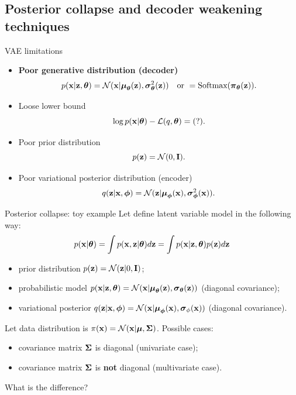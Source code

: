 \subsection{Posterior collapse and decoder weakening techniques}
\begin{frame}{VAE limitations}
	\begin{itemize}
		\item \textbf{Poor generative distribution (decoder)}
		\[
			p(\mathbf{x} | \mathbf{z}, \boldsymbol{\theta}) = \mathcal{N}(\mathbf{x}| \boldsymbol{\mu}_{\boldsymbol{\theta}}(\mathbf{z}), \boldsymbol{\sigma}^2_{\boldsymbol{\theta}}(\mathbf{z})) \quad \text{or } = \text{Softmax}(\boldsymbol{\pi}_{\boldsymbol{\theta}}(\mathbf{z})).
		\]
		\item Loose lower bound
		\[
			\log p(\mathbf{x} | \boldsymbol{\theta}) - \mathcal{L}(q, \boldsymbol{\theta}) = (?).
		\]
		\item Poor prior distribution
		\[
			p(\mathbf{z}) = \mathcal{N}(0, \mathbf{I}).
		\]
		\item Poor variational posterior distribution (encoder)
		\[
			q(\mathbf{z} | \mathbf{x}, \boldsymbol{\phi}) = \mathcal{N}(\mathbf{z}| \boldsymbol{\mu}_{\boldsymbol{\phi}}(\mathbf{x}), \boldsymbol{\sigma}^2_{\boldsymbol{\phi}}(\mathbf{x})).
		\]
	\end{itemize}
\end{frame}
\begin{frame}{Posterior collapse: toy example}
	Let define latent variable model in the following way:
	\[
	p(\mathbf{x} | \boldsymbol{\theta}) = \int p(\mathbf{x}, \mathbf{z} | \boldsymbol{\theta}) d \mathbf{z} = \int p(\mathbf{x} | \mathbf{z}, \boldsymbol{\theta}) p(\mathbf{z}) d \mathbf{z} 
	\]
	\begin{itemize}
		\item prior distribution $p(\mathbf{z}) = \mathcal{N}(\mathbf{z}| 0, \mathbf{I})$;
		\item probabilistic model $p(\mathbf{x} | \mathbf{z}, \boldsymbol{\theta}) = \mathcal{N}(\mathbf{x} | \boldsymbol{\mu}_{\boldsymbol{\theta}}(\mathbf{z}), \boldsymbol{\sigma}_{\boldsymbol{\theta}}(\mathbf{z}))$ (diagonal covariance);
		\item variational posterior $q(\mathbf{z} | \mathbf{x}, \boldsymbol{\phi}) =  \mathcal{N}(\mathbf{x} | \boldsymbol{\mu}_{\boldsymbol{\phi}}(\mathbf{x}), \boldsymbol{\sigma}_{\phi}(\mathbf{x}))$  (diagonal covariance).
	\end{itemize}
	
	Let data distribution is $\pi(\mathbf{x}) = \mathcal{N}(\mathbf{x} | \boldsymbol{\mu}, \boldsymbol{\Sigma})$. Possible cases:
	\begin{itemize}
		\item covariance matrix $\boldsymbol{\Sigma}$ is diagonal (univariate case);
		\item covariance matrix $\boldsymbol{\Sigma}$ is \textbf{not} diagonal (multivariate case).
	\end{itemize}
	What is the difference?
\end{frame}

